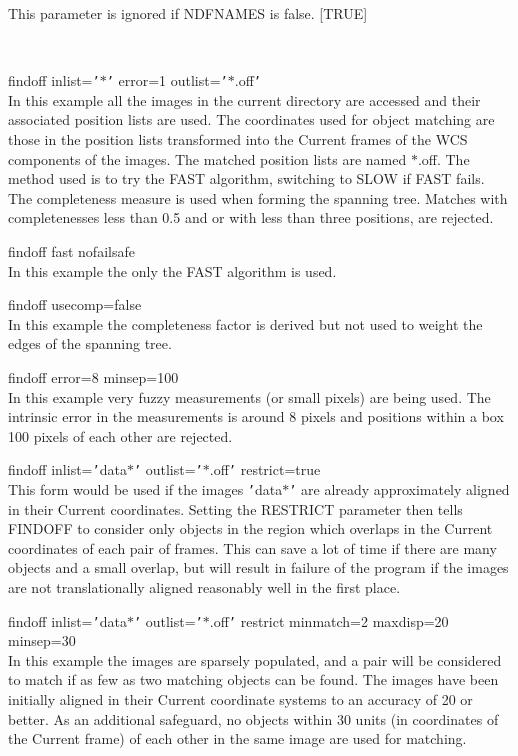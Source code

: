\documentclass[twoside,11pt]{article}
\renewcommand{\_}{\texttt{\symbol{95}}}
\newcommand{\qs}[1]{{\tt '}#1{\tt '}}
\newcommand{\sstexamples}[1]{
   \item[Examples:] \mbox{} \\
   \vspace{-3.5ex}
   \begin{description}
      #1
   \end{description}
}
\newcommand{\sstexamplesubsection}[2]{\sloppy \item{\ssttt #1} \mbox{} \\ #2 }
\newcommand{\sstnotes}[1]{\item[Notes:] \mbox{} \\[1.3ex] #1}
\newcommand{\sstitemlist}[1]{
  \mbox{} \\
  \vspace{-3.5ex}
  \begin{itemize}
     #1
  \end{itemize}
}
\newcommand{\sstexamples}[1]{
      \item[Examples:] \\
      \begin{description}
         #1
      \end{description}
      \\
   }
\newcommand{\sstexamplesubsection}[2]{\item[{\ssttt #1}] #2}
\newcommand{\sstnotes}[1]{\item[Notes:] #1 }
\newcommand{\sstitemlist}[1]{
      \begin{itemize}
         #1
      \end{itemize}
      \\
   }
\begin{document}
{{{         This parameter is ignored if NDFNAMES is false.
         [TRUE]
      }
   }
   \sstexamples{
      \sstexamplesubsection{
         findoff inlist=\qs{$*$} error=1 outlist=\qs{$*$.off}
      } {
         In this example all the images in the current directory are
         accessed and their associated position lists are used.
         The coordinates used for object matching are those in the
         position lists transformed into the Current frames of the
         WCS components of the images.  The matched position lists are
         named $*$.off.  The method used is to try the FAST algorithm,
         switching to SLOW if FAST fails. The completeness measure
         is used when forming the spanning tree.  Matches with
         completenesses less than 0.5 and or with less than three
         positions, are rejected.
      }
      \sstexamplesubsection{
         findoff fast nofailsafe
      } {
         In this example the only the FAST algorithm is used.
      }
      \sstexamplesubsection{
         findoff usecomp=false
      } {
         In this example the completeness factor is derived but not used
         to weight the edges of the spanning tree.
      }
      \sstexamplesubsection{
         findoff error=8 minsep=100
      }{
         In this example very fuzzy measurements (or small pixels) are
         being used.  The intrinsic error in the measurements is around
         8 pixels and positions within a box 100 pixels of each other
         are rejected.
      }
      \sstexamplesubsection{
         findoff inlist={\tt '}data$*${\tt '} outlist={\tt '}$*$.off{\tt '} restrict=true
      }{
         This form would be used if the images {\tt '}data$*${\tt '} are already
         approximately aligned in their Current coordinates. Setting the
         RESTRICT parameter then tells FINDOFF to consider only objects
         in the region which overlaps in the Current coordinates of
         each pair of frames. This can save a lot of time if there
         are many objects and a small overlap, but will result in
         failure of the program if the images are not translationally
         aligned reasonably well in the first place.
      }
      \sstexamplesubsection{
         findoff inlist={\tt '}data$*${\tt '} outlist={\tt '}$*$.off{\tt '} restrict minmatch=2
              maxdisp=20 minsep=30
      }{
         In this example the images are sparsely populated, and a pair
         will be considered to match if as few as two matching objects
         can be found.  The images have been initially aligned in their
         Current coordinate systems to an accuracy of 20 or better.  As
         an additional safeguard, no objects within 30 units (in
         coordinates of the Current frame) of each other in the same image
         are used for matching.
      }
   }
   \sstnotes{
      \sstitemlist{

}}}
\end{document}

